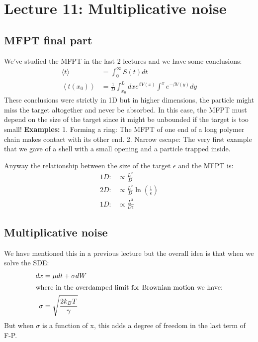 \documentclass{report}
\begin{document}
\chapter{Lecture 11: Multiplicative noise}
\section{MFPT final part}
We've studied the MFPT in the last 2 lectures and we have some conclusions:
\begin{align}
    \langle t\rangle                            & =\int_0^{\infty} S(t) d t                                               \\
    \left\langle t\left(x_0\right)\right\rangle & =\frac{1}{D} \int^L_{x_0} d x e^{\beta V(x)} \int^x e^{-\beta V(y)} d y
\end{align}
These conclusions were strictly in 1D but in higher dimensions, the particle might miss the target altogether and never be absorbed. In this case, the MFPT must depend on the size of the target since it might be unbounded if the target is too small!
\textbf{Examples:} 1. Forming a ring: The MFPT of one end of a long polymer chain makes contact with its other end. 2. Narrow escape: The very first example that we gave of a shell with a small opening and a particle trapped inside.

Anyway the relationship between the size of the target $\epsilon$ and the MFPT is:
\begin{align}
    1D: & \propto \frac{L^2}{D}                         \\
    2D: & \propto \frac{L^2}{D} \ln(\frac{1}{\epsilon}) \\
    1D: & \propto \frac{L^3}{D\epsilon}
\end{align}
\section{Multiplicative noise}
We have mentioned this in a previous lecture but the overall idea is that when we solve the SDE:
\begin{align}
    d x    & =\mu d t+\sigma d W            \\
    \intertext{where in the overdamped limit for Brownian motion we have:}
    \sigma & =\sqrt{\frac{2 k_B T}{\gamma}}
\end{align}
But when $\sigma$ is a function of x, this adds a degree of freedom in the last term of F-P. 
\end{document}

